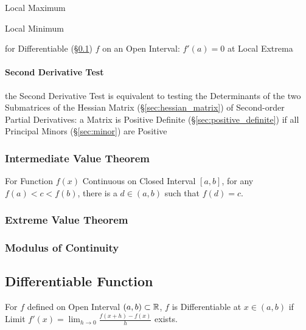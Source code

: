Local Maximum

Local Minimum

for Differentiable (\S\ref{sec:differentiable_function}) $f$ on an
Open Interval: $f'(a) = 0$ at Local Extrema



\paragraph{Second Derivative Test}\label{sec:second_derivative_test}\hfill

the Second Derivative Test is equivalent to testing the Determinants of the two
Submatrices of the Hessian Matrix (\S\ref{sec:hessian_matrix}) of Second-order
Partial Derivatives: a Matrix is Positive Definite
(\S\ref{sec:positive_definite}) if all Principal Minors (\S\ref{sec:minor}) are
Positive



\subsubsection{Intermediate Value Theorem}
\label{sec:intermediate_value}

For Function $f(x)$ Continuous on Closed Interval $[a,b]$, for any
$f(a) < c < f(b)$, there is a $d \in (a,b)$ such that $f(d) = c$.



\subsubsection{Extreme Value Theorem}\label{sec:extreme_value}

\subsubsection{Modulus of Continuity}\label{sec:continuity_modulus}



\subsection{Differentiable Function}\label{sec:differentiable_function}

For $f$ defined on Open Interval $(a,b) \subset \mathbb{R}$, $f$ is
Differentiable at $x \in (a,b)$ if Limit $f'(x) = \lim_{h \rightarrow
  0} \frac{f (x+h) - f(x)}{h}$ exists.

